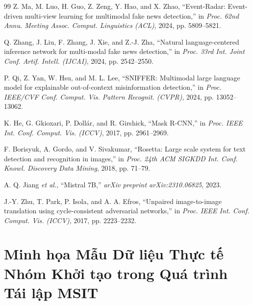 \documentclass[conference,10pt]{IEEEtran}
\begin{document}
\begin{thebibliography}{99}
Z. Ma, M. Luo, H. Guo, Z. Zeng, Y. Hao, and X. Zhao, ``Event-Radar: Event-driven multi-view learning for multimodal fake news detection,'' in \textit{Proc. 62nd Annu. Meeting Assoc. Comput. Linguistics (ACL)}, 2024, pp. 5809--5821.

Q. Zhang, J. Liu, F. Zhang, J. Xie, and Z.-J. Zha, ``Natural language-centered inference network for multi-modal fake news detection,'' in \textit{Proc. 33rd Int. Joint Conf. Artif. Intell. (IJCAI)}, 2024, pp. 2542--2550.

P. Qi, Z. Yan, W. Hsu, and M. L. Lee, ``SNIFFER: Multimodal large language model for explainable out-of-context misinformation detection,'' in \textit{Proc. IEEE/CVF Conf. Comput. Vis. Pattern Recognit. (CVPR)}, 2024, pp. 13052--13062.

K. He, G. Gkioxari, P. Doll\'{a}r, and R. Girshick, ``Mask R-CNN,'' in \textit{Proc. IEEE Int. Conf. Comput. Vis. (ICCV)}, 2017, pp. 2961--2969.

F. Borisyuk, A. Gordo, and V. Sivakumar, ``Rosetta: Large scale system for text detection and recognition in images,'' in \textit{Proc. 24th ACM SIGKDD Int. Conf. Knowl. Discovery Data Mining}, 2018, pp. 71--79.

A. Q. Jiang \textit{et al.}, ``Mistral 7B,'' \textit{arXiv preprint arXiv:2310.06825}, 2023.

J.-Y. Zhu, T. Park, P. Isola, and A. A. Efros, ``Unpaired image-to-image translation using cycle-consistent adversarial networks,'' in \textit{Proc. IEEE Int. Conf. Comput. Vis. (ICCV)}, 2017, pp. 2223--2232.

\end{thebibliography}

\appendices

\section{Minh họa Mẫu Dữ liệu Thực tế Nhóm Khởi tạo trong Quá trình Tái lập MSIT}
\end{document}
